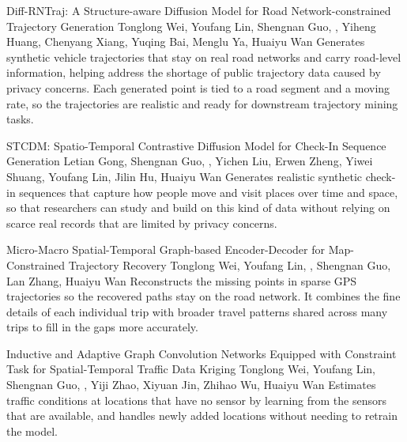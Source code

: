 {Diff-RNTraj: A Structure-aware Diffusion Model for Road Network-constrained Trajectory Generation}
{Tonglong Wei, Youfang Lin, Shengnan Guo, \me, Yiheng Huang, Chenyang Xiang, Yuqing Bai, Menglu Ya, Huaiyu Wan}
{Generates synthetic vehicle trajectories that stay on real road networks and carry road-level information, helping address the shortage of public trajectory data caused by privacy concerns. Each generated point is tied to a road segment and a moving rate, so the trajectories are realistic and ready for downstream trajectory mining tasks.}

{STCDM: Spatio-Temporal Contrastive Diffusion Model for Check-In Sequence Generation}
{Letian Gong, Shengnan Guo, \me, Yichen Liu, Erwen Zheng, Yiwei Shuang, Youfang Lin, Jilin Hu, Huaiyu Wan}
{Generates realistic synthetic check-in sequences that capture how people move and visit places over time and space, so that researchers can study and build on this kind of data without relying on scarce real records that are limited by privacy concerns.}

{Micro-Macro Spatial-Temporal Graph-based Encoder-Decoder for Map-Constrained Trajectory Recovery}
{Tonglong Wei, Youfang Lin, \me, Shengnan Guo, Lan Zhang, Huaiyu Wan}
{Reconstructs the missing points in sparse GPS trajectories so the recovered paths stay on the road network. It combines the fine details of each individual trip with broader travel patterns shared across many trips to fill in the gaps more accurately.}

{Inductive and Adaptive Graph Convolution Networks Equipped with Constraint Task for Spatial-Temporal Traffic Data Kriging}
{Tonglong Wei, Youfang Lin, Shengnan Guo, \me, Yiji Zhao, Xiyuan Jin, Zhihao Wu, Huaiyu Wan}
{Estimates traffic conditions at locations that have no sensor by learning from the sensors that are available, and handles newly added locations without needing to retrain the model.}

